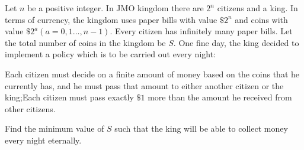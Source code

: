 Let $n$ be a positive integer. In JMO kingdom there are $2^n$ citizens and a king. In terms of currency, the kingdom uses paper bills with value $\$2^n$ and coins with value $\$2^a(a=0,1\ldots ,n-1)$. Every citizen has infinitely many paper bills. Let the total number of coins in the kingdom be $S$. One fine day, the king decided to implement a policy which is to be carried out every night:

Each citizen must decide on a finite amount of money based on the 
coins that he currently has, and he must pass that amount to either 
another citizen or the king;Each citizen must pass exactly $\$1$ more than the amount he received from other citizens.

Find the minimum value of $S$ such that the king will be able to collect money every night eternally.
